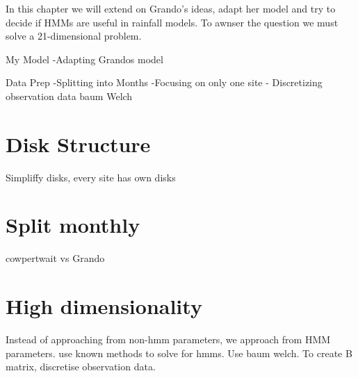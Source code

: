 In this chapter we will extend on Grando's ideas, adapt her model and try to decide if HMMs are useful in rainfall models. To awnser the question we must solve a 21-dimensional problem.

My Model
-Adapting Grandos model

Data Prep
-Splitting into Months
-Focusing on only one site
- Discretizing observation data
baum Welch




\section{Disk Structure}

Simpliffy disks, every site has own disks

\section{Split monthly}

cowpertwait vs Grando

\section{High dimensionality}

Instead of approaching from non-hmm parameters, we approach from HMM parameters. use known methods to solve for hmms. Use baum welch. To create B matrix, discretise observation data.

